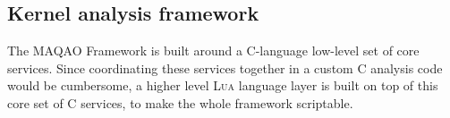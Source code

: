 \documentclass[11pt, a4paper, twoside]{montblanc2}
\def\lua{\textsc{Lua}\xspace}
\begin{document}
\subsection{Kernel analysis framework}


The MAQAO Framework is built around a C-language low-level set of core services. 
Since coordinating these services together in a custom C analysis code would be 
cumbersome, a higher level \lua language layer is built on top of this core set 
of C services, to make the whole framework scriptable.
\end{document}
